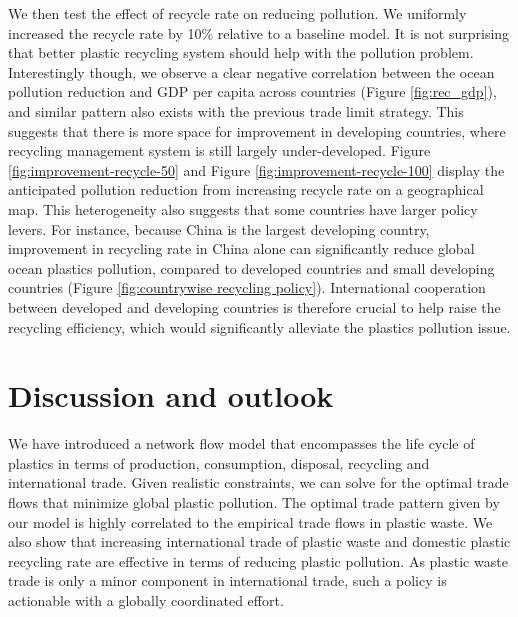 \documentclass[dvipsnames]{article}
\begin{document}
We then test the effect of recycle rate on reducing pollution. We uniformly increased the recycle rate by 10\% relative to a baseline model. It is not surprising that better plastic recycling system should help with the pollution problem. Interestingly though, we observe a clear negative correlation between the ocean pollution reduction and GDP per capita across countries (Figure \ref{fig:rec_gdp}), and similar pattern also exists with the previous trade limit strategy. This suggests that there is more space for improvement in developing countries, where recycling management system is still largely under-developed. Figure \ref{fig:improvement-recycle-50} and Figure \ref{fig:improvement-recycle-100} display the anticipated pollution reduction from increasing recycle rate on a geographical map. This heterogeneity also suggests that some countries have larger policy levers. For instance, because China is the largest developing country, improvement in recycling rate in China alone can significantly reduce global ocean plastics pollution, compared to developed countries and small developing countries (Figure \ref{fig:countrywise recycling policy}). International cooperation between developed and developing countries is therefore crucial to help raise the recycling efficiency, which would significantly alleviate the plastics pollution issue.



\section{Discussion and outlook}


We have introduced a network flow model that encompasses the life cycle of plastics in terms of production, consumption, disposal, recycling and international trade. Given realistic constraints, we can solve for the optimal trade flows that minimize global plastic pollution. The optimal trade pattern given by our model is highly correlated to the empirical trade flows in plastic waste. We also show that increasing international trade of plastic waste and domestic plastic recycling rate are effective in terms of reducing plastic pollution. As plastic waste trade is only a minor component in international trade, such a policy is actionable with a globally coordinated effort.
\end{document}
